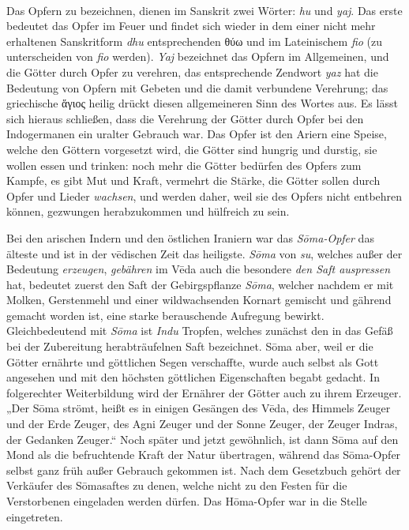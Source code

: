 \documentclass{article}
\begin{document}
\begin{center}
\end{center}
\paragraph{}
Das Opfern zu bezeichnen, dienen im Sanskrit zwei Wörter: \emph{hu} und \emph{yaj}. Das erste bedeutet das Opfer im Feuer und findet sich wieder in dem einer nicht mehr erhaltenen Sanskritform \emph{dhu} entsprechenden \textgreek{θύω} und im Lateinischem \emph{fio} (zu unterscheiden von \emph{fio} werden). \emph{Yaj} bezeichnet das Opfern im Allgemeinen, und die Götter durch Opfer zu verehren, das entsprechende Zendwort \emph{yaz} hat die Bedeutung von Opfern mit Gebeten und die damit verbundene Verehrung; das griechische \textgreek{ἅγιος} heilig drückt diesen allgemeineren Sinn des Wortes aus. Es lässt sich hieraus schließen, dass die Verehrung der Götter durch Opfer bei den Indogermanen ein uralter Gebrauch war. Das Opfer ist den Ariern eine Speise, welche den Göttern vorgesetzt wird, die Götter sind hungrig und durstig, sie wollen essen und trinken: noch mehr die Götter bedürfen des Opfers zum Kampfe, es gibt Mut und Kraft, vermehrt die Stärke, die Götter sollen durch Opfer und Lieder \emph{wachsen}, und werden daher, weil sie des Opfers nicht entbehren können, gezwungen herabzukommen und hülfreich zu sein.

Bei den arischen Indern und den östlichen Iraniern war das \emph{S\={o}ma-Opfer} das älteste und ist in der v\={e}dischen Zeit das heiligste. \emph{S\={o}ma} von \emph{su}, welches außer der Bedeutung \emph{erzeugen}, \emph{gebähren} im V\={e}da auch die besondere \emph{den Saft auspressen} hat, bedeutet zuerst den Saft der Gebirgspflanze \emph{S\={o}ma}, welcher nachdem er mit Molken, Gerstenmehl und einer wildwachsenden Kornart gemischt und gährend gemacht worden ist, eine starke berauschende Aufregung bewirkt. Gleichbedeutend mit \emph{S\={o}ma} ist \emph{Indu} Tropfen, welches zunächst den in das Gefäß bei der Zubereitung herabträufelnen Saft bezeichnet. S\={o}ma aber, weil er die Götter ernährte und göttlichen Segen verschaffte, wurde auch selbst als Gott angesehen und mit den höchsten göttlichen Eigenschaften begabt gedacht. In folgerechter Weiterbildung wird der Ernährer der Götter auch zu ihrem Erzeuger. „Der S\={o}ma strömt, heißt es in einigen Gesängen des V\={e}da, des Himmels Zeuger und der Erde Zeuger, des Agni Zeuger und der Sonne Zeuger, der Zeuger Indras, der Gedanken Zeuger.“ Noch später und jetzt gewöhnlich, ist dann S\={o}ma auf den Mond als die befruchtende Kraft der Natur übertragen, während das S\={o}ma-Opfer selbst ganz früh außer Gebrauch gekommen ist. Nach dem Gesetzbuch gehört der Verkäufer des S\={o}masaftes zu denen, welche nicht zu den Festen für die Verstorbenen eingeladen werden dürfen. Das H\={o}ma-Opfer war in die Stelle eingetreten.
\end{document}
